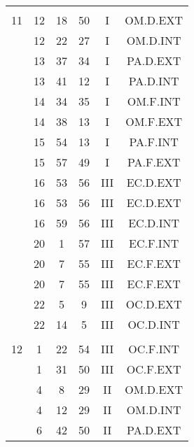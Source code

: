 \documentclass[12pt, a4paper]{article}
\begin{document}
\begin{multicols}{3}
{\begin{tabular}{c c c c c c}
	 	 	 	 & & & & & \\%
	 	 	 	11 & 12 & 18 & 50 & I & OM.D.EXT\\%
	 	 	 	 & 12 & 22 & 27 & I & OM.D.INT\\%
	 	 	 	 & 13 & 37 & 34 & I & PA.D.EXT\\%
	 	 	 	 & 13 & 41 & 12 & I & PA.D.INT\\%
	 	 	 	 & 14 & 34 & 35 & I & OM.F.INT\\%
	 	 	 	 & 14 & 38 & 13 & I & OM.F.EXT\\%
	 	 	 	 & 15 & 54 & 13 & I & PA.F.INT\\%
	 	 	 	 & 15 & 57 & 49 & I & PA.F.EXT\\%
	 	 	 	 & 16 & 53 & 56 & III & EC.D.EXT\\%
	 	 	 	 & 16 & 53 & 56 & III & EC.D.EXT\\%
	 	 	 	 & 16 & 59 & 56 & III & EC.D.INT\\%
	 	 	 	 & 20 & 1 & 57 & III & EC.F.INT\\%
	 	 	 	 & 20 & 7 & 55 & III & EC.F.EXT\\%
	 	 	 	 & 20 & 7 & 55 & III & EC.F.EXT\\%
	 	 	 	 & 22 & 5 & 9 & III & OC.D.EXT\\%
	 	 	 	 & 22 & 14 & 5 & III & OC.D.INT\\%
	 	 	 	 & & & & & \\%
	 	 	 	12 & 1 & 22 & 54 & III & OC.F.INT\\%
	 	 	 	 & 1 & 31 & 50 & III & OC.F.EXT\\%
	 	 	 	 & 4 & 8 & 29 & II & OM.D.EXT\\%
	 	 	 	 & 4 & 12 & 29 & II & OM.D.INT\\%
	 	 	 	 & 6 & 42 & 50 & II & PA.D.EXT\\%
	 	 \end{tabular}
 	}
\end{multicols}
\end{document}
